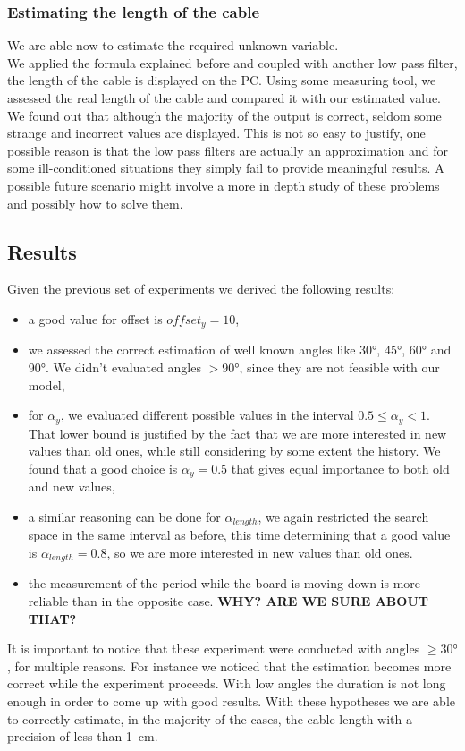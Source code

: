 \subsubsection{Estimating the length of the cable}
We are able now to estimate the required unknown variable. \\ We applied the formula explained before and coupled with another low pass filter, the length of the cable is displayed on the PC. Using some measuring tool, we assessed the real length of the cable and compared it with our estimated value. We found out that although the majority of the output is correct, seldom some strange and incorrect values are displayed. This is not so easy to justify, one possible reason is that the low pass filters are actually an approximation and for some ill-conditioned situations they simply fail to provide meaningful results. A possible future scenario might involve a more in depth study of these problems and possibly how to solve them.
\subsection{Results}
Given the previous set of experiments we derived the following results:
\begin{itemize}
	\item a good value for offset is $offset_y = 10$,
	\item we assessed the correct estimation of well known angles like $30\si{\degree}$, $45\si{\degree}$, $60\si{\degree}$ and $90\si{\degree}$. We didn't evaluated angles $> 90\si{\degree}$, since they are not feasible with our model,
	\item for $\alpha_y$, we evaluated different possible values in the interval $0.5 \leq \alpha_y < 1 $. That lower bound is justified by the fact that we are more interested in new values than old ones, while still considering by some extent the history. We found that a good choice is $\alpha_y = 0.5$ that gives equal importance to both old and new values,
	\item a similar reasoning can be done for $\alpha_{length}$, we again restricted the search space in the same interval as before, this time determining that a good value is $\alpha_{length} = 0.8$, so we are more interested in new values than old ones.
	\item the measurement of the period while the board is moving down is more reliable than in the opposite case. \textbf{WHY? ARE WE SURE ABOUT THAT?}
\end{itemize}
It is important to notice that these experiment were conducted with angles $\geq 30\si{\degree}$, for multiple reasons. For instance we noticed that the estimation becomes more correct while the experiment proceeds. With low angles the duration is not long enough in order to come up with good results. 
With these hypotheses we are able to correctly estimate, in the majority of the cases, the cable length with a precision of less than \SI{1}{\cm}.

